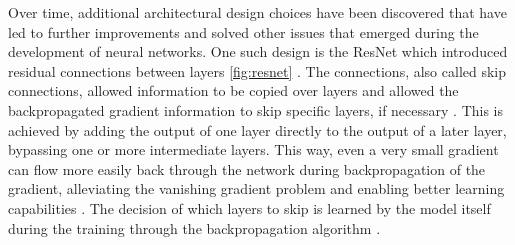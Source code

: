 Over time, additional architectural design choices have been discovered that have led to further improvements and solved other issues that emerged during the development of neural networks.
One such design is the ResNet \cite{he2016DeepResidualLearning} which introduced residual connections between layers \autoref{fig:resnet} \cite{he2016DeepResidualLearning, aggarwal2018NeuralNetworksDeep}.
The connections, also called skip connections, allowed information to be copied over layers and allowed the backpropagated gradient information to skip specific layers, if necessary \cite{he2016DeepResidualLearning, aggarwal2018NeuralNetworksDeep}.
This is achieved by adding the output of one layer directly to the output of a later layer, bypassing one or more intermediate layers.
This way, even a very small gradient can flow more easily back through the network during backpropagation of the gradient, alleviating the vanishing gradient problem and enabling better learning capabilities \cite{he2016DeepResidualLearning, aggarwal2018NeuralNetworksDeep}.
The decision of which layers to skip is learned by the model itself during the training through the backpropagation algorithm \cite{he2016DeepResidualLearning, aggarwal2018NeuralNetworksDeep}.

